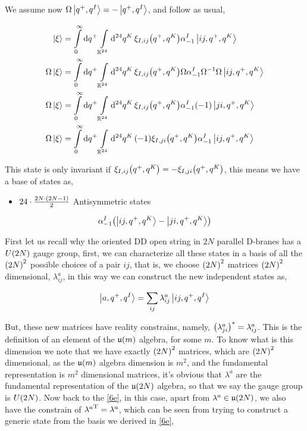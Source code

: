 \probitem{}
\label{6f}
We assume now $\Omega\ket{q^+,q^I}=-\ket{q^+,q^I}$, and follow as usual,

\begin{align*}
    \ket{\xi}&=\int\limits_0^\infty\dd{q^+}\int\limits_{\mathbb R^{24}}\dd[24]{q^K}\xi_{I,ij}\qty(q^+,q^K)\alpha^I_{-1}\ket{ij,q^+,q^K}\\
    \Omega\ket{\xi}&=\int\limits_0^\infty\dd{q^+}\int\limits_{\mathbb R^{24}}\dd[24]{q^K}\xi_{I,ij}\qty(q^+,q^K)\Omega\alpha^I_{-1}\Omega^{-1}\Omega\ket{ij,q^+,q^K}\\
    \Omega\ket{\xi}&=\int\limits_0^\infty\dd{q^+}\int\limits_{\mathbb R^{24}}\dd[24]{q^K}\xi_{I,ij}\qty(q^+,q^K)\alpha^I_{-1}\qty(-1)\ket{ji,q^+,q^K}\\
    \Omega\ket{\xi}&=\int\limits_0^\infty\dd{q^+}\int\limits_{\mathbb R^{24}}\dd[24]{q^K}\qty(-1)\xi_{I,ji}\qty(q^+,q^K)\alpha^I_{-1}\ket{ij,q^+,q^K}
\end{align*}

This state is only invariant if $\xi_{I,ij}\qty(q^+,q^K)=-\xi_{I,ji}\qty(q^+,q^K)$, this means we have a base of states as,

\begin{itemize}
    \item $24\cdot\frac{2N\cdot \qty(2N-1)}{2}$ Antisymmetric states
\end{itemize}
\begin{align*}
    \alpha^I_{-1}\qty(\ket{ij,q^+,q^K}-\ket{ji,q^+,q^K})
\end{align*}

\probitem{}

First let us recall why the oriented DD open string in $2N$ parallel D-branes has a $U\qty(2N)$ gauge group, first, 
we can characterize all these states in a basis of all the $\qty(2N)^2$ possible choices of a pair $ij$, that is, 
we choose $\qty(2N)^2$ matrices $\qty(2N)^2$ dimensional, $\lambda^{a}_{ij}$, in this way we can construct the new independent states as,

\begin{align*}
    \ket{a,q^+,q^I}=\sum\limits_{ij}\lambda^{a}_{ij}\ket{ij,q^+,q^I}
\end{align*}

But, these new matrices have reality constrains, namely, ${\qty(\lambda_{ji}^a)}^\ast=\lambda_{ij}^a$. This is the definition of an element of the $\mathfrak u\qty(m)$ algebra, for some $m$. To know what is this dimension we note that we have exactly $\qty(2N)^2$ matrices, which are $\qty(2N)^2$ dimensional, as the $\mathfrak u\qty(m)$ algebra dimension is $m^2$, and the fundamental representation is $m^2$ dimensional matrices, it's obvious that $\lambda^a$ are the fundamental representation of the 
$\mathfrak u\qty(2N)$ algebra, so that we say the gauge group is $U\qty(2N)$. Now back to the \ref{6e}, in this case, apart from $\lambda^a\in \mathfrak u\qty(2N)$, we 
also have the constrain of ${\lambda^a}^{\textnormal{T}}=\lambda^a$, which can be seen from trying to construct a generic state from the basis 
we derived in \ref{6e},

